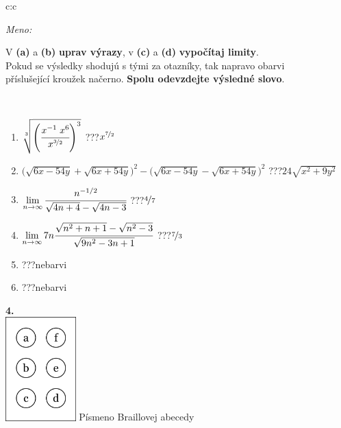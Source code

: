 \documentclass[10pt]{report}
\begin{document}
\begin{tabular}{c:c}
\begin{minipage}[c][104.5mm][t]{0.5\linewidth}
\begin{center}
\textit{Meno:}\phantom{xxxxxxxxxxxxxxxxxxxxxxxxxxxxxxxxxxxxxxxxxxxxxxxxxxxxxxxxxxxxxxxxx}\\[5mm]
\begin{minipage}{0.95\linewidth}
\begin{center}
V \textbf{(a)} a \textbf{(b)} \textbf{uprav výrazy}, v \textbf{(c)} a \textbf{(d)} \textbf{vypočítaj limity}.\\Pokud se výsledky shodujú s tými za otazníky, tak napravo obarvi\\příslušející kroužek načerno. \textbf{Spolu odevzdejte výsledné slovo}.
\end{center}
\end{minipage}
\\[1mm]
\begin{minipage}{0.79\linewidth}
\begin{center}
\begin{varwidth}{\linewidth}
\begin{enumerate}
\small
\item $\sqrt[3]{\left(\cfrac{x^{-1}\;x^{6}}{x^{\nicefrac{3}{2}}}\right)^{3}}$\quad \dotfill\; ???\;\dotfill \quad $x^{\nicefrac{7}{2}}$
\item {\footnotesize{\scriptsize$\big(\sqrt{6x-54y}+\sqrt{6x+54y}\big)^2-\big(\sqrt{6x-54y}-\sqrt{6x+54y}\big)^2$}\quad \dotfill\; ???\;\dotfill \quad $24\sqrt{x^2+9y^2}$}
\item $\lim\limits_{n\to\infty}\cfrac{n^{-1/2}}{\sqrt{4n+4}-\sqrt{4n-3}}$\quad \dotfill\; ???\;\dotfill \quad $\nicefrac{4}{7}$
\item $\lim\limits_{n\to\infty}7n\cfrac{\sqrt{n^2+n+1}-\sqrt{n^2-3}}{\sqrt{9n^2-3n+1}}$\quad \dotfill\; ???\;\dotfill \quad $\nicefrac{7}{3}$
\item \quad \dotfill\; ???\;\dotfill \quad nebarvi
\item \quad \dotfill\; ???\;\dotfill \quad nebarvi
\end{enumerate}
\end{varwidth}
\end{center}
\end{minipage}
\begin{minipage}{0.20\linewidth}
\begin{center}
{\Huge\bfseries 4.} \\[2mm]
\includegraphics[height=40mm]{../images/braille.png}
{\small Písmeno Braillovej abecedy}
\end{center}
\end{minipage}
\end{center}
\end{minipage}
%
\end{tabular}
\end{document}
